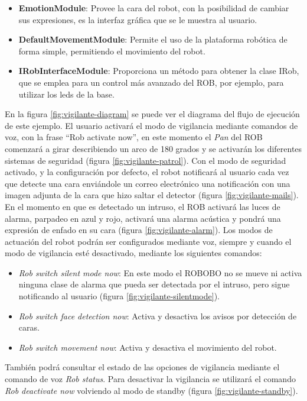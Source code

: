 \begin{itemize}
	\item \textbf{EmotionModule}: Provee la cara del robot, con la posibilidad de cambiar sus expresiones, es la interfaz gráfica que se le muestra al usuario.
	\item \textbf{DefaultMovementModule}: Permite el uso de la plataforma robótica de forma simple, permitiendo el movimiento del robot.
	\item \textbf{IRobInterfaceModule}: Proporciona un método para obtener la clase IRob, que se emplea para un control más avanzado del ROB, por ejemplo, para utilizar los leds de la base.
\end{itemize}
En la figura \ref{fig:vigilante-diagram} se puede ver el diagrama del flujo de ejecución de este ejemplo.
El usuario activará el modo de vigilancia mediante comandos de voz, con la frase \enquote{Rob activate now}, en este momento el \textit{Pan} del ROB comenzará a girar describiendo un arco de 180 grados y se activarán los diferentes sistemas de seguridad (figura \ref{fig:vigilante-patrol}).
Con el modo de seguridad activado, y la configuración por defecto, el  robot notificará al usuario cada vez que detecte una cara enviándole un correo electrónico una notificación con una imagen adjunta de la cara que hizo saltar el detector (figura \ref{fig:vigilante-mails}).
En el momento en que es detectado un intruso, el ROB activará las luces de alarma, parpadeo en azul y rojo, activará una alarma acústica y pondrá una expresión de enfado en su cara (figura \ref{fig:vigilante-alarm}).
Los modos de actuación del robot podrán ser configurados mediante voz, siempre y cuando el modo de vigilancia esté desactivado, mediante los siguientes comandos:
\begin{itemize}
	\item \textit{Rob switch silent mode now}: En este modo el ROBOBO no se mueve ni activa ninguna clase de alarma que pueda ser detectada por el intruso, pero sigue notificando al usuario (figura \ref{fig:vigilante-silentmode}).
	\item \textit{Rob switch face detection now}: Activa y desactiva los avisos por detección de caras.
	\item \textit{Rob switch movement now}: Activa y desactiva el movimiento del robot.
\end{itemize}
También podrá consultar el estado de las opciones de vigilancia mediante el comando de voz \textit{Rob status}.
Para desactivar la vigilancia se utilizará el comando \textit{Rob deactivate now} volviendo al modo de standby (figura \ref{fig:vigilante-standby}).


